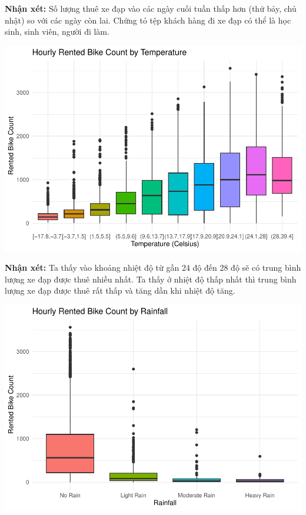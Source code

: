 \documentclass[
  11pt,
  letterpaper,
]{article}
\begin{document}
\textbf{Nhận xét:} Số lượng thuê xe đạp vào các ngày cuối tuần thấp hơn (thứ bảy, chủ nhật) so với các ngày còn lai. Chứng tỏ tệp khách hàng đi xe đạp có thể là học sinh, sinh viên, người đi làm.

\begin{center}\includegraphics[width=1.2\linewidth,]{Final_Project_files/figure-latex/unnamed-chunk-7-1} \end{center}

\textbf{Nhận xét:} Ta thấy vào khoảng nhiệt độ từ gần 24 độ đến 28 độ sẽ có trung bình lượng xe đạp được thuê nhiều nhất. Ta thấy ở nhiệt độ thấp nhất thì trung bình lượng xe đạp được thuê rất thấp và tăng dần khi nhiệt độ tăng.

\begin{center}\includegraphics[width=1.2\linewidth,]{Final_Project_files/figure-latex/unnamed-chunk-8-1} \end{center}
\end{document}
